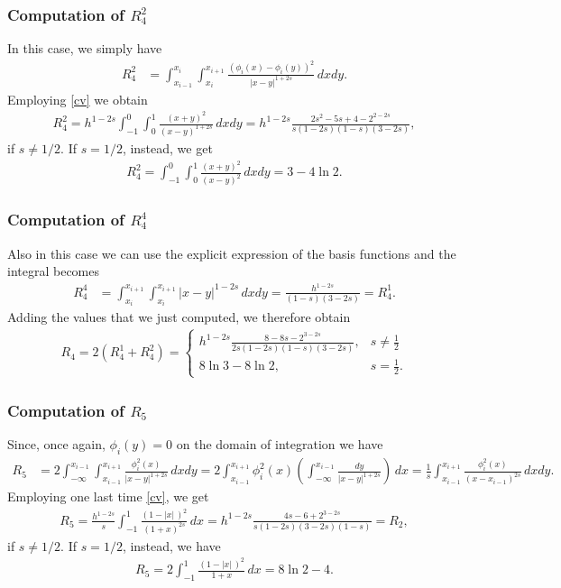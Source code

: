 {\subsubsection*{Computation of $R_4^2$}
In this case, we simply have
\begin{align*}
	R_4^2 &= \int_{x_{i-1}}^{x_i}\int_{x_i}^{x_{i+1}} \frac{(\phi_i(x)-\phi_i(y))^2}{|x-y|^{1+2s}}\,dxdy.
\end{align*}
Employing \eqref{cv} we obtain
\begin{align*}
	R_4^2 = h^{1-2s}\int_{-1}^0\int_0^1 \frac{(x+y)^2}{(x-y)^{1+2s}}\,dxdy = h^{1-2s}\frac{2s^2-5s+4-2^{2-2s}}{s(1-2s)(1-s)(3-2s)}, 
\end{align*}
if $s\neq 1/2$. If $s=1/2$, instead, we get
\begin{align*}
	R_4^2 = \int_{-1}^0\int_0^1 \frac{(x+y)^2}{(x-y)^2}\,dxdy = 3-4\ln 2.
\end{align*}
\subsubsection*{Computation of $R_4^4$}
Also in this case we can use the explicit expression of the basis functions and the integral becomes
\begin{align*}
	R_4^4 &= \int_{x_i}^{x_{i+1}}\int_{x_i}^{x_{i+1}} |x-y|^{1-2s}\,dxdy = \frac{h^{1-2s}}{(1-s)(3-2s)}=R_4^1. 
\end{align*}
Adding the values that we just computed, we therefore obtain
\begin{align*}
	R_4 = 2(R_4^1+R_4^2) = \begin{cases}
					\displaystyle h^{1-2s}\frac{8-8s-2^{3-2s}}{2s(1-2s)(1-s)(3-2s)}, & \displaystyle s\neq \frac{1}{2}
					\\
					8\ln 3-8\ln 2, & \displaystyle s=\frac{1}{2}.
				\end{cases}	
\end{align*}

\subsubsection*{Computation of $R_5$}
Since, once again, $\phi_i(y) = 0$ on the domain of integration we have
\begin{align*}
	R_5 &= 2\int_{-\infty}^{x_{i-1}}\int_{x_{i-1}}^{x_{i+1}} \frac{\phi_i^2(x)}{|x-y|^{1+2s}}\,dxdy = 2\int_{x_{i-1}}^{x_{i+1}}\phi_i^2(x)\left(\int_{-\infty}^{x_{i-1}} \frac{dy}{|x-y|^{1+2s}}\right)\,dx = \frac{1}{s}\int_{x_{i-1}}^{x_{i+1}}\frac{\phi_i^2(x)}{(x-x_{i-1})^{2s}}\,dxdy.
\end{align*}
Employing one last time \eqref{cv}, we get
\begin{align*}
	R_5 = \frac{h^{1-2s}}{s}\int_{-1}^1 \frac{(1-|x|\,)^2}{(1+x)^{2s}}\,dx = h^{1-2s}\frac{4s-6+2^{3-2s}}{s(1-2s)(3-2s)(1-s)}=R_2,
\end{align*}
if $s\neq 1/2$. If $s=1/2$, instead, we have
\begin{align*}
	R_5 = 2\int_{-1}^1 \frac{(1-|x|\,)^2}{1+x}\,dx = 8\ln 2-4.
\end{align*}

}
